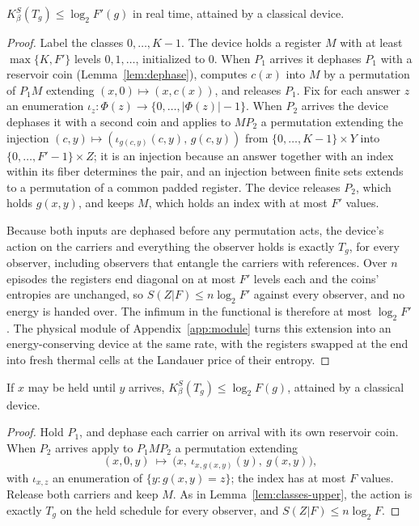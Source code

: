 \begin{lemma}\label{lem:classes-upper}
$K_\beta^S(T_g)\le\log_2F'(g)$ in real time, attained by a classical device.
\end{lemma}
\begin{proof}
Label the classes $0,\dots,K-1$. The device holds a register $M$ with at least $\max\{K,F'\}$ levels $0,1,\dots$, initialized to $0$. When $P_1$ arrives it dephases $P_1$ with a reservoir coin (Lemma~\ref{lem:dephase}), computes $c(x)$ into $M$ by a permutation of $P_1M$ extending $(x,0)\mapsto(x,c(x))$, and releases $P_1$. Fix for each answer $z$ an enumeration $\iota_z:\Phi(z)\to\{0,\dots,|\Phi(z)|-1\}$. When $P_2$ arrives the device dephases it with a second coin and applies to $MP_2$ a permutation extending the injection $(c,y)\mapsto(\iota_{g(c,y)}(c,y),\,g(c,y))$ from $\{0,\dots,K-1\}\times Y$ into $\{0,\dots,F'-1\}\times Z$; it is an injection because an answer together with an index within its fiber determines the pair, and an injection between finite sets extends to a permutation of a common padded register. The device releases $P_2$, which holds $g(x,y)$, and keeps $M$, which holds an index with at most $F'$ values.

Because both inputs are dephased before any permutation acts, the device's action on the carriers and everything the observer holds is exactly $T_g$, for every observer, including observers that entangle the carriers with references. Over $n$ episodes the registers end diagonal on at most $F'$ levels each and the coins' entropies are unchanged, so $S(Z|F)\le n\log_2F'$ against every observer, and no energy is handed over. The infimum in the functional is therefore at most $\log_2F'$. The physical module of Appendix~\ref{app:module} turns this extension into an energy-conserving device at the same rate, with the registers swapped at the end into fresh thermal cells at the Landauer price of their entropy.
\end{proof}

\begin{lemma}[Held]\label{lem:classes-upper-held}
If $x$ may be held until $y$ arrives, $K_\beta^S(T_g)\le\log_2F(g)$, attained by a classical device.
\end{lemma}
\begin{proof}
Hold $P_1$, and dephase each carrier on arrival with its own reservoir coin. When $P_2$ arrives apply to $P_1MP_2$ a permutation extending
\[
(x,0,y)\ \mapsto\ \bigl(x,\ \iota_{x,g(x,y)}(y),\ g(x,y)\bigr),
\]
with $\iota_{x,z}$ an enumeration of $\{y:g(x,y)=z\}$; the index has at most $F$ values. Release both carriers and keep $M$. As in Lemma~\ref{lem:classes-upper}, the action is exactly $T_g$ on the held schedule for every observer, and $S(Z|F)\le n\log_2F$.
\end{proof}

